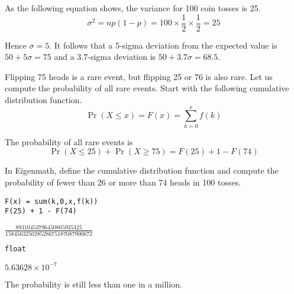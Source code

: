 \bigskip
As the following equation shows, the variance for 100 coin tosses is 25.
\begin{equation*}
\sigma^2=np(1-p)=100\times\frac{1}{2}\times\frac{1}{2}=25
\end{equation*}

Hence $\sigma=5$.
It follows that a 5-sigma deviation from the expected value is
$50+5\sigma=75$ and a
3.7-sigma deviation is $50+3.7\sigma=68.5$.

\bigskip
Flipping 75 heads is a rare event, but flipping 25 or 76 is also rare.
Let us compute the probability of all rare events.
Start with the following cumulative distribution function.
\begin{equation*}
\Pr(X\le x)=F(x)=\sum_{k=0}^xf(k)
\end{equation*}

The probability of all rare events is
\begin{equation*}
\Pr(X\le25)+\Pr(X\ge75)=F(25)+1-F(74)
\end{equation*}

In Eigenmath, define the cumulative distribution function and compute the probability
of fewer than 26 or more than 74 heads in 100 tosses.

{\color{blue}
\begin{verbatim}
F(x) = sum(k,0,x,f(k))
F(25) + 1 - F(74)
\end{verbatim}}

$\frac{89310453796450805935325}{158456325028528675187087900672}$

{\color{blue}
\begin{verbatim}
float
\end{verbatim}}

$5.63628\times10^{-7}$

\bigskip
The probability is still less than one in a million.


